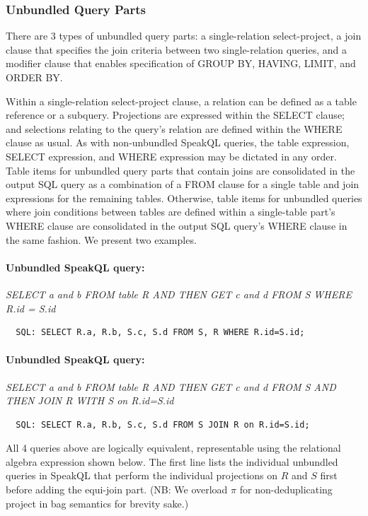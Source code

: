 \subsubsection{\textbf{Unbundled Query Parts}}

There are 3 types of unbundled query parts: a single-relation select-project, a join clause that specifies the join criteria between two single-relation queries, and a modifier clause that enables specification of GROUP BY, HAVING, LIMIT, and ORDER BY.

Within a single-relation select-project clause, a relation can be defined as a table reference or a subquery. 
Projections are expressed within the SELECT clause; and selections relating to the query's relation are defined within the WHERE clause as usual. 
As with non-unbundled SpeakQL queries, the table expression, SELECT expression, and WHERE expression may be dictated in any order. 
Table items for unbundled query parts that contain joins are consolidated in the output SQL query as a combination of a FROM clause for a single table and join expressions for the remaining tables. 
Otherwise, table items for unbundled queries where join conditions between tables are defined within a single-table part's WHERE clause are consolidated in the output SQL query's WHERE clause in the same fashion.
We present two examples.


\paragraph{Unbundled SpeakQL query:} \emph{SELECT a and b FROM table R AND THEN GET c and d FROM S WHERE R.id = S.id}
\begin{verbatim}
  SQL: SELECT R.a, R.b, S.c, S.d FROM S, R WHERE R.id=S.id;
\end{verbatim}

\vspace{2mm}
\paragraph{Unbundled SpeakQL query:} \emph{SELECT a and b FROM table R AND THEN GET c and d FROM S AND THEN JOIN R WITH S on R.id=S.id}
\begin{verbatim}
  SQL: SELECT R.a, R.b, S.c, S.d FROM S JOIN R on R.id=S.id;
\end{verbatim}

\vspace{2mm}
All 4 queries above are logically equivalent, representable using the relational algebra expression shown below.
The first line lists the individual unbundled queries in SpeakQL that perform the individual projections on $R$ and $S$ first before adding the equi-join part. (NB: We overload $\pi$ for non-deduplicating project in bag semantics for brevity sake.)

